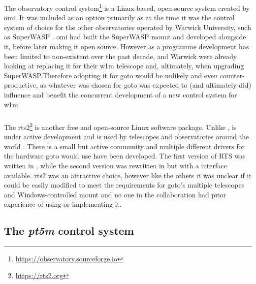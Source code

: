 \begin{colsection}
\begin{colsection}
\subsubsection{}

The  observatory control system\footnote{\url{https://observatory.sourceforge.io}} is a Linux-based, open-source system created by \gls{omi}. It was included as an option primarily as at the time it was the control system of choice for the other observatories operated by Warwick University, such as SuperWASP \citep{SuperWASP}. \gls{omi} had built the SuperWASP mount and developed  alongside it, before later making it open source. However as a programme development has been limited to non-existent over the past decade, and Warwick were already looking at replacing it for their \gls{w1m} telescope and, ultimately, when upgrading SuperWASP.\@ Therefore adopting it for \gls{goto} would be unlikely and even counter-productive, as whatever was chosen for \gls{goto} was expected to (and ultimately did) influence and benefit the concurrent development of a new control system for \gls{w1m}.

\subsubsection{}

The \gls{rts2}\footnote{\url{https://rts2.org}} \citep{RTS2, RTS2b} is another free and open-source Linux software package. Unlike ,  is under active development and is used by telescopes and observatories around the world \citep{BORAT, BOOTES-3, antarctic, ARTN}. There is a small but active community and multiple different drivers for the hardware \gls{goto} would use have been developed. The first version of RTS was written in , while the second version was rewritten in  but with a  interface available. \gls{rts2} was an attractive choice, however like the others it was unclear if it could be easily modified to meet the requirements for \gls{goto}'s multiple telescopes and Windows-controlled mount and no one in the collaboration had prior experience of using or implementing it.

\end{colsection}


\subsection{The \textit{pt5m} control system}
\label{sec:pt5m}
\begin{colsection}


\end{colsection}
\end{colsection}
